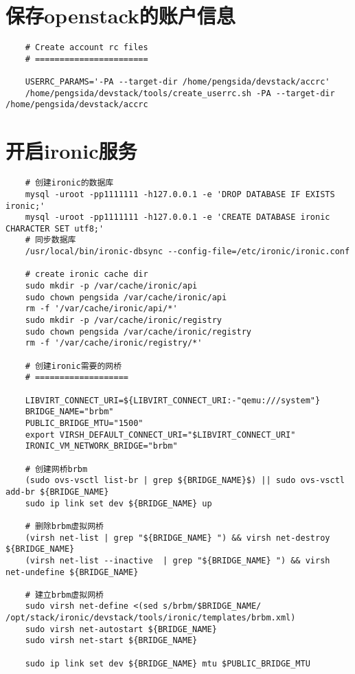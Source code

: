 \documentclass[a4paper,left=1.5cm,right=1.5cm,11pt]{article}
\begin{document}
\section{保存openstack的账户信息}
	\begin{lstlisting}
	# Create account rc files
	# =======================

	USERRC_PARAMS='-PA --target-dir /home/pengsida/devstack/accrc'
	/home/pengsida/devstack/tools/create_userrc.sh -PA --target-dir /home/pengsida/devstack/accrc
	\end{lstlisting}

\section{开启ironic服务}
	\begin{lstlisting}
	# 创建ironic的数据库
	mysql -uroot -pp1111111 -h127.0.0.1 -e 'DROP DATABASE IF EXISTS ironic;'
	mysql -uroot -pp1111111 -h127.0.0.1 -e 'CREATE DATABASE ironic CHARACTER SET utf8;'
	# 同步数据库
	/usr/local/bin/ironic-dbsync --config-file=/etc/ironic/ironic.conf

	# create ironic cache dir
	sudo mkdir -p /var/cache/ironic/api
    sudo chown pengsida /var/cache/ironic/api
    rm -f '/var/cache/ironic/api/*'
    sudo mkdir -p /var/cache/ironic/registry
    sudo chown pengsida /var/cache/ironic/registry
    rm -f '/var/cache/ironic/registry/*'

	# 创建ironic需要的网桥
	# ===================

	LIBVIRT_CONNECT_URI=${LIBVIRT_CONNECT_URI:-"qemu:///system"}
	BRIDGE_NAME="brbm"
	PUBLIC_BRIDGE_MTU="1500"
	export VIRSH_DEFAULT_CONNECT_URI="$LIBVIRT_CONNECT_URI"
	IRONIC_VM_NETWORK_BRIDGE="brbm"

	# 创建网桥brbm
	(sudo ovs-vsctl list-br | grep ${BRIDGE_NAME}$) || sudo ovs-vsctl add-br ${BRIDGE_NAME}
	sudo ip link set dev ${BRIDGE_NAME} up

	# 删除brbm虚拟网桥
	(virsh net-list | grep "${BRIDGE_NAME} ") && virsh net-destroy ${BRIDGE_NAME}
	(virsh net-list --inactive  | grep "${BRIDGE_NAME} ") && virsh net-undefine ${BRIDGE_NAME}

	# 建立brbm虚拟网桥
	sudo virsh net-define <(sed s/brbm/$BRIDGE_NAME/ /opt/stack/ironic/devstack/tools/ironic/templates/brbm.xml)
	sudo virsh net-autostart ${BRIDGE_NAME}
	sudo virsh net-start ${BRIDGE_NAME}

	sudo ip link set dev ${BRIDGE_NAME} mtu $PUBLIC_BRIDGE_MTU
	

\end{lstlisting}
\end{document}
